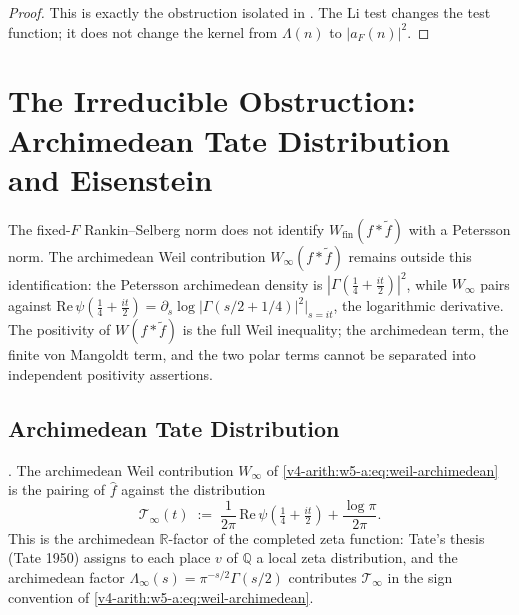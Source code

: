 \begin{proof}
This is exactly the obstruction isolated in
. The Li test changes the test
function; it does not change the kernel from \(\Lambda(n)\) to
\(|a_F(n)|^2\).
\end{proof}

\section{The Irreducible Obstruction: Archimedean Tate Distribution and Eisenstein}
\label{v4-arith:w5-a:sec:obstruction}

The fixed-\(F\) Rankin--Selberg norm does not identify
\(W_{\mathrm{fin}}(f*\widetilde{f})\) with a Petersson norm.
The archimedean Weil contribution \(W_{\infty}(f*\widetilde{f})\)
remains outside this identification: the Petersson archimedean
density is \(|\Gamma(\tfrac{1}{4}+\tfrac{it}{2})|^{2}\), while
\(W_{\infty}\) pairs against
\(\mathrm{Re}\,\psi(\tfrac{1}{4}+\tfrac{it}{2})=\partial_{s}\log|\Gamma(s/2+1/4)|^{2}|_{s=it}\),
the logarithmic derivative. The positivity of \(W(f*\widetilde{f})\)
is the full Weil inequality; the archimedean term, the finite
von Mangoldt term, and the two polar terms cannot be separated into
independent positivity assertions.

\subsection{Archimedean Tate Distribution}
\label{v4-arith:w5-a:obstruction:archimedean}

\begin{definition}
\label{v4-arith:w5-a:def:tate-archimedean}
\ClaimStatusDefinitional. The archimedean Weil contribution
\(W_{\infty}\) of \eqref{v4-arith:w5-a:eq:weil-archimedean} is the
pairing of \(\widehat{f}\) against the distribution
\begin{equation}
\label{v4-arith:w5-a:eq:tate-archimedean-distribution}
\mathcal{T}_{\infty}(t)\;:=\;\frac{1}{2\pi}\,\mathrm{Re}\,\psi\!\left(\tfrac{1}{4}+\tfrac{it}{2}\right)+\frac{\log\pi}{2\pi}.
\end{equation}
This is the archimedean \(\mathbb{R}\)-factor of the completed zeta
function: Tate's thesis (Tate 1950) assigns to each place \(v\) of
\(\mathbb{Q}\) a local zeta distribution, and the archimedean factor
\(\Lambda_{\infty}(s)=\pi^{-s/2}\Gamma(s/2)\) contributes
\(\mathcal{T}_{\infty}\) in the sign convention of
\eqref{v4-arith:w5-a:eq:weil-archimedean}.
\end{definition}

